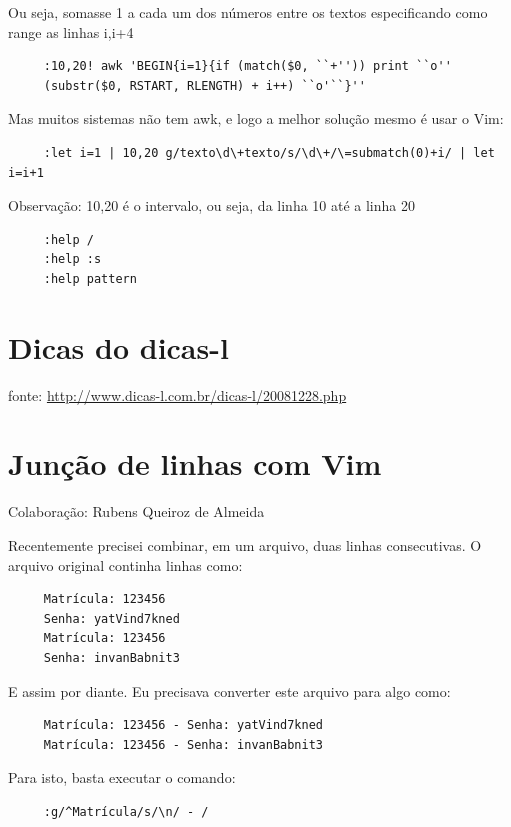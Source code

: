 \documentclass[10pt,a4paper,openany]{book}
\begin{document}
 Ou seja, somasse 1 a cada um dos números entre os textos
 especificando como range as linhas i,i+4

\begin{verbatim}
     :10,20! awk 'BEGIN{i=1}{if (match($0, ``+'')) print ``o''
     (substr($0, RSTART, RLENGTH) + i++) ``o'``}''
\end{verbatim}

 Mas muitos sistemas não tem awk, e logo a melhor solução mesmo é usar o Vim:

\begin{verbatim}
     :let i=1 | 10,20 g/texto\d\+texto/s/\d\+/\=submatch(0)+i/ | let i=i+1
\end{verbatim}

Observação: 10,20 é o intervalo, ou seja, da linha 10 até a linha 20

\begin{verbatim}
     :help /
     :help :s
     :help pattern
\end{verbatim}

\section{Dicas do dicas-l}

fonte: \url{http://www.dicas-l.com.br/dicas-l/20081228.php}

\section{Junção de linhas com Vim}
\label{Junção de linhas com Vim}
Colaboração: Rubens Queiroz de Almeida

Recentemente precisei combinar, em um arquivo, duas linhas
consecutivas. O arquivo original continha linhas como:

\begin{verbatim}
     Matrícula: 123456
     Senha: yatVind7kned
     Matrícula: 123456
     Senha: invanBabnit3
\end{verbatim}

E assim por diante. Eu precisava converter este arquivo para algo como:

\begin{verbatim}
     Matrícula: 123456 - Senha: yatVind7kned
     Matrícula: 123456 - Senha: invanBabnit3
\end{verbatim}

Para isto, basta executar o comando:

\begin{verbatim}
     :g/^Matrícula/s/\n/ - /
\end{verbatim}
\end{document}
